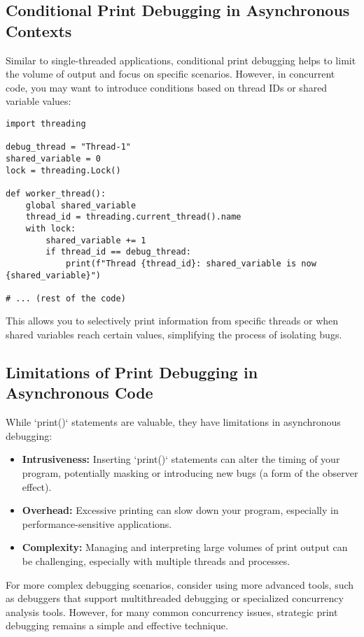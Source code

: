 \documentclass{article}
\begin{document}
{{{\subsection*{Conditional Print Debugging in Asynchronous Contexts}

Similar to single-threaded applications, conditional print debugging helps to limit the volume of output and focus on specific scenarios. However, in concurrent code, you may want to introduce conditions based on thread IDs or shared variable values:

\begin{verbatim}
import threading

debug_thread = "Thread-1"
shared_variable = 0
lock = threading.Lock()

def worker_thread():
    global shared_variable
    thread_id = threading.current_thread().name
    with lock:
        shared_variable += 1
        if thread_id == debug_thread:
            print(f"Thread {thread_id}: shared_variable is now {shared_variable}")

# ... (rest of the code)
\end{verbatim}

This allows you to selectively print information from specific threads or when shared variables reach certain values, simplifying the process of isolating bugs.

\subsection*{Limitations of Print Debugging in Asynchronous Code}

While `print()` statements are valuable, they have limitations in asynchronous debugging:

\begin{itemize}
    \item \textbf{Intrusiveness:} Inserting `print()` statements can alter the timing of your program, potentially masking or introducing new bugs (a form of the observer effect).
    \item \textbf{Overhead:} Excessive printing can slow down your program, especially in performance-sensitive applications.
    \item \textbf{Complexity:} Managing and interpreting large volumes of print output can be challenging, especially with multiple threads and processes.
\end{itemize}

For more complex debugging scenarios, consider using more advanced tools, such as debuggers that support multithreaded debugging or specialized concurrency analysis tools. However, for many common concurrency issues, strategic print debugging remains a simple and effective technique.

}}}
\end{document}
